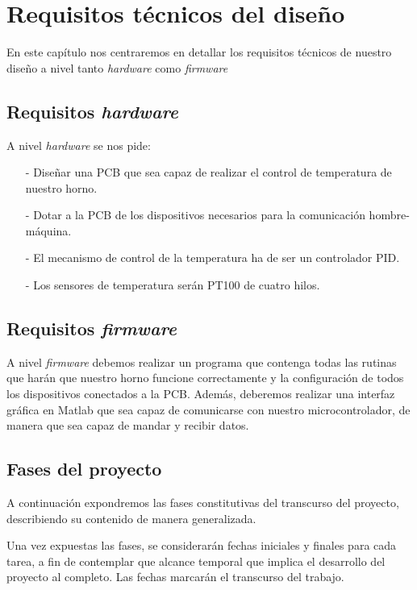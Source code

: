\chapter{Requisitos técnicos del diseño}
\label{cap:capitulo_2}

En este capítulo nos centraremos en detallar los requisitos técnicos de nuestro diseño a nivel tanto
\textit{hardware} como \textit{firmware}



\section{Requisitos \textit{hardware}}
A nivel \textit{hardware} se nos pide:
\begin{itemize}
\item[-] Diseñar una \acrshort{PCB} que sea capaz de realizar el control de temperatura de nuestro horno. 
\item[-] Dotar a la \acrshort{PCB} de los dispositivos necesarios para la comunicación hombre-máquina.
\item[-] El mecanismo de control de la temperatura ha de ser un controlador PID.
\item[-] Los sensores de temperatura serán PT100 de cuatro hilos.
\end{itemize}

\section{Requisitos \textit{firmware}}
A nivel \textit{firmware} debemos realizar un programa que contenga todas las rutinas que harán que nuestro horno funcione correctamente y la configuración de todos los dispositivos conectados a la \acrshort{PCB}. Además, deberemos realizar una interfaz gráfica en Matlab que sea capaz de comunicarse con nuestro microcontrolador, de manera que sea capaz de mandar y recibir datos.



\section{Fases del proyecto}

A continuación expondremos las fases constitutivas del transcurso del proyecto, describiendo su contenido de manera generalizada.

Una vez expuestas las fases, se considerarán fechas iniciales y finales para cada tarea, a fin de contemplar que alcance temporal que implica el desarrollo del proyecto al completo. Las fechas marcarán el transcurso del trabajo.

